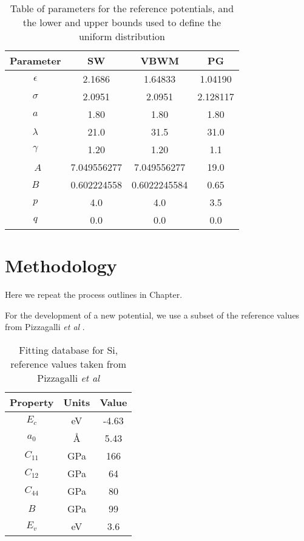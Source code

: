 \begin{table}[h]
	\centering
	\caption{Table of parameters for the reference potentials, and the lower and upper bounds used to define the uniform distribution}
	\label{table:sw_parameters_ref}
	\begin{tabular}{c c c c}
		\hline
		Parameter & SW & VBWM & PG \\
		\hline
		$\epsilon$ & 2.1686 & 1.64833 & 1.04190 \\
		$\sigma$ &   2.0951 & 2.0951 & 2.128117 \\
		$a$ &       1.80 & 1.80 & 1.80 \\
		$\lambda$ & 21.0 & 31.5 & 31.0 \\
		$\gamma$ & 1.20 & 1.20 & 1.1 \\\
		$A$ & 7.049556277 & 7.049556277 & 19.0 \\
		$B$ & 0.602224558 & 0.6022245584 & 0.65 \\
		$p$ & 4.0 & 4.0 & 3.5 \\
		$q$ & 0.0 & 0.0 & 0.0 \\
		\hline
	\end{tabular}
\end{table}

\section{Methodology}

Here we repeat the process outlines in Chapter.

For the development of a new potential, we use a subset of the reference values from Pizzagalli \emph{et al} \cite{pizzagalli2013_sw_Si}.

\begin{table}[htbp]
	\centering
	\caption{Fitting database for Si, reference values taken from Pizzagalli \emph{et al}\cite{pizzagalli2013_sw_Si}}
	\label{table:si_fitting_db}
	\begin{tabular}{c c c}
		\hline
		Property & Units & Value \\
		\hline
		$E_c$ 		& eV 	& -4.63 \\
		$a_0$ 		& \AA 	&  5.43 \\
		$C_{11}$ 	& GPa 	& 166 \\
		$C_{12}$ 	& GPa 	& 64 \\
		$C_{44}$ 	& GPa 	& 80 \\
		$B$ 		& GPa 	& 99 \\
		$E_v$ 		& eV 	& 3.6 \\
		\hline
	\end{tabular}
\end{table}


